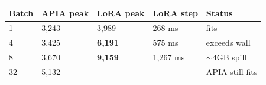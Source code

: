 \begin{tabular}{lllll}
\toprule
Batch & APIA peak & LoRA peak & LoRA step & Status \\
\midrule
1 & 3,243 & 3,989 & 268 ms & fits \\
4 & 3,425 & \textbf{6,191} & 575 ms & exceeds wall \\
8 & 3,670 & \textbf{9,159} & 1,267 ms & $\sim$4GB spill \\
32 & 5,132 & --- & --- & APIA still fits \\
\bottomrule
\end{tabular}
